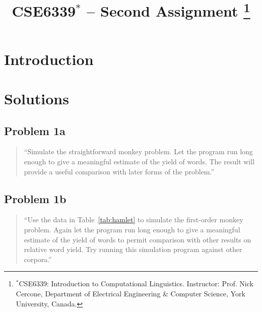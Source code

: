 \documentclass{IEEEtran}
\begin{document}
\title{CSE6339$^*$ -- Second Assignment
\thanks{$^*$CSE6339: Introduction to Computational Linguistics. 
Instructor: Prof. Nick Cercone, Department of Electrical Engineering \& Computer Science, York University, Canada.}}
\author{}

\maketitle


\begin{abstract}
\end{abstract}

\section{Introduction}

\section{Solutions}

\subsection{Problem 1a}

\begin{quote}
``Simulate the straightforward monkey problem. Let the program run long enough to 
give a meaningful estimate of the yield of words. The result will provide a 
useful comparison with later forms of the problem.''
\end{quote}


\subsection{Problem 1b}

\begin{quote}
``Use the data in Table~\ref{tab:hamlet} to simulate the first-order monkey problem. 
Again let the program run long enough to give a meaningful estimate of the yield 
of words to permit comparison with other results on relative word yield. Try running
this simulation program against other corpora.''
\end{quote}
\end{document}
